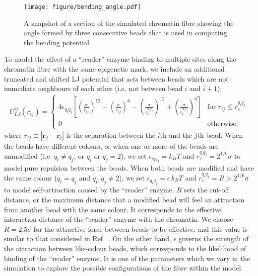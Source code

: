 \documentclass[12pt]{article}
\newcommand{\abs}[1]{\left|#1\right|}
\begin{document}
\begin{figure}[t]
\centering
\texttt{[image: figure/bending\_angle.pdf]}
\caption{A snapshot of a section of the simulated chromatin fibre showing the angle formed by three consecutive beads that is used in computing the bending potential.}
\label{fig:bending}
\end{figure}

To model the effect of a ``reader'' enzyme binding to multiple sites along the chromatin fibre with the same epigenetic mark, we include an additional truncated and shifted LJ potential that acts between beads which are not immediate neighbours of each other (i.e. not between bead $i$ and $i+1$):
\begin{eqnarray}
U_{LJ}^{ij}(r_{ij}) = \left\{ 
	\begin{array}{ll}
	4\epsilon_{q_iq_j} \left[ \left(\frac{\sigma}{r_{ij}}\right)^{12}-\left(\frac{\sigma}{r_{ij}}\right)^{6}-\left(\frac{\sigma}{r_c^{q_iq_j}}\right)^{12}+\left(\frac{\sigma}{r_c^{q_iq_j}}\right)^{6}\right] & \textrm{for $r_{ij} \le r_c^{q_iq_j}$}\\
	0 & \textrm{otherwise},
	\end{array}
\right.
\end{eqnarray}
where $r_{ij} \equiv \abs{\bm{r}_j - \bm{r}_i}$ is the separation between the $i$th and the $j$th bead. When the beads have different colours, or when one or more of the beads are unmodified (i.e. $q_i \neq q_j$, or $q_i$ or $q_j = 2$), we set $\epsilon_{q_iq_j} = k_BT$ and $r_c^{q_iq_j} = 2^{1/6}\sigma$ to model pure repulsion between the beads. When both beads are modified and have the same colour ($q_i = q_j$ and $q_i, q_j \neq 2$), we set $\epsilon_{q_iq_j}= \epsilon\,k_BT$ and $r_c^{q_iq_j} = R > 2^{1/6}\sigma$ to model self-attraction caused by the ``reader'' enzyme. $R$ sets the cut-off distance, or the maximum distance that a modified bead will feel an attraction from another bead with the same colour. It corresponds to the effective interaction distance of the ``reader'' enzyme with the chromatin. We choose $R = 2.5\sigma$ for the attractive force between beads to be effective, and this value is similar to that considered in Ref.~\cite{michieletto2016}. On the other hand, $\epsilon$ governs the strength of the attraction between like-colour beads, which corresponds to the likelihood of binding of the ``reader'' enzyme. It is one of the parameters which we vary in the simulation to explore the possible configurations of the fibre within the model.
\end{document}
